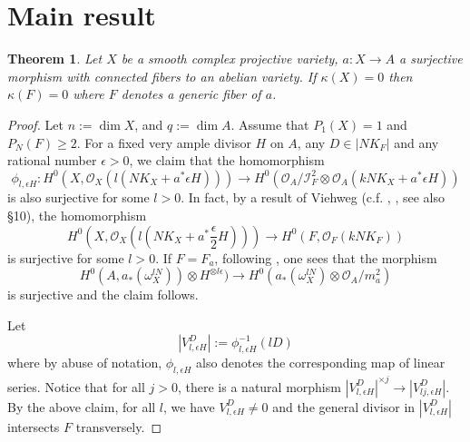 \documentclass[10pt, a4paper]{amsart}
\newtheorem{thm}{Theorem}[section]
\newcommand\lra{\longrightarrow}
\newcommand\ot{{\otimes}}
\newcommand\OO{{\mathcal{O}}}
\newcommand\II{{\mathcal{I}}}
\begin{document}
\section{Main result}
\begin{thm} \label{T1}
Let $X$ be a smooth complex projective variety, $a:X\lra A$ a surjective
morphism with connected fibers to an abelian variety. If $\kappa (X)=0$
then $\kappa (F)=0$ where $F$ denotes a generic fiber of $a$.
\end{thm}
\begin{proof}
Let $n:=\dim X$, and $q:=\dim A$.
Assume that $P_1(X)=1$ and $P_N(F)\geq 2$.
For a fixed very ample divisor $H$ on $A$, any $D\in |NK_F|$ and
any rational number $\epsilon>0$, we claim that the homomorphism
$$
\phi _{l,\epsilon H}:
H^0(X,\OO _X(l(NK_X+a^*\epsilon H)))\lra H^0(\OO _A/\II _F^2\ot \OO _A
(kNK_X+a^*\epsilon H))$$ is also surjective for some $l> 0$.
In fact,
by a result of Viehweg (c.f. \cite{V1}, \cite{V2}, see also \cite{Ko2} \S 10),
the homomorphism
$$
H^0(X,\OO _X(l(NK_X+a^*\frac{\epsilon}{2} H)))\lra H^0(F,\OO _F
(kNK_F))$$ is surjective for some $l> 0$.
If $F=F_a$, following \cite{PP}, one sees that the morphism
$$H^0(A, a_* (\omega _X^{lN}))\ot H^{\ot l\epsilon})\lra H^0(a_* (\omega _X^{lN})
\ot \OO _A /m_a^2)$$
is surjective and the claim follows.

Let $$|V _{l,\epsilon H}^{D  }|:=\phi _{l,\epsilon H}^{-1}(lD)$$
where by abuse of notation, 
$\phi _{l , \epsilon H}$ also denotes the corresponding map of linear series. 
Notice that for all $j>0$, there is a natural morphism
$|V^{D}_{l, \epsilon H}|^{\times j}\lra |V^{D}_{lj,\epsilon H}|$.
By the above claim, for all $l$, we have
$V _{l,\epsilon H}^{D}\ne 0$ and the general divisor in $|V _{l,\epsilon H}^{D}|$
intersects $F$ transversely.


\end{proof}
\end{document}
